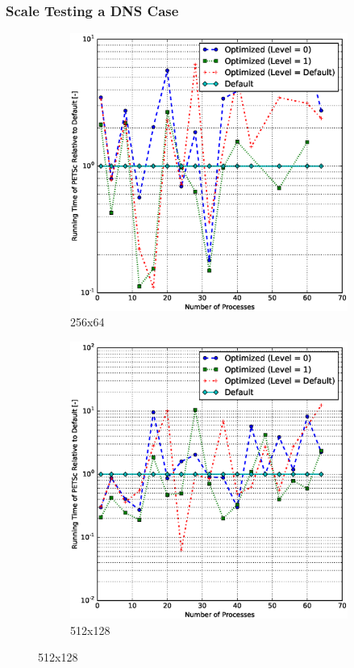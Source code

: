 \documentclass[11pt]{beamer}
\begin{document}
\begin{frame}
\begin{textblock}{6}
  \end{textblock}
\end{frame}

\begin{frame}
  \frametitle{Scale Testing a DNS Case}
  \begin{figure}[h]
    \centering
    \begin{subfigure}{0.45\textwidth}
      \includegraphics[width=\textwidth]{petsc/laminar-256x64}
      \caption{256x64}
    \end{subfigure}
    \hfill
    \begin{subfigure}{0.45\textwidth}
      \includegraphics[width=\textwidth]{petsc/laminar-512x128}
      \caption{512x128}
    \end{subfigure}
  \end{figure}
\end{frame}
\end{document}
